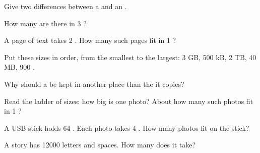 \begin{exercise}[$\star$]\label{exo:g4:memory-and-storage:2}
Give two differences between a  and an .
\end{exercise}

\begin{exercise}[$\star$]\label{exo:g4:memory-and-storage:3}
How many  are there in 3 ?
\end{exercise}

\begin{exercise}[$\star$]\label{exo:g4:memory-and-storage:4}
A page of text takes 2 . How many such pages fit in 1 ?
\end{exercise}

\begin{exercise}[$\star$]\label{exo:g4:memory-and-storage:5}
Put these sizes in order, from the smallest to the largest: 3 GB, 500 kB,
2 TB, 40 MB, 900 .
\end{exercise}

\begin{exercise}[$\star$]\label{exo:g4:memory-and-storage:6}
Why should a  be kept in another place than the  it copies?
\end{exercise}

\begin{exercise}[$\star$]\label{exo:g4:memory-and-storage:7}
Read the ladder of sizes: how big is one photo? About how many such photos
fit in 1 ?
\end{exercise}

\begin{exercise}[$\star$]\label{exo:g4:memory-and-storage:8}
A USB stick holds 64 . Each photo takes 4 . How many photos
fit on the stick?
\end{exercise}

\begin{exercise}[$\star\star$]\label{exo:g4:memory-and-storage:9}
A story has \num{12000} letters and spaces. How many  does it take?
\end{exercise}

